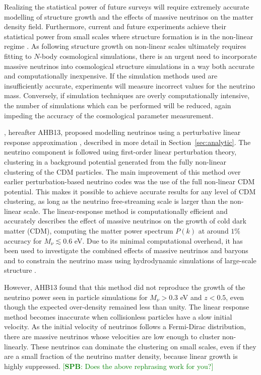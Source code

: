 \documentclass[useAMS, usenatbib]{mnras}
\newcommand{\spb}[1]{{\textcolor{green}{[{\bf SPB}: #1]}}}
\begin{document}
Realizing the statistical power of future surveys will require extremely accurate modelling of structure growth and the effects of massive neutrinos on the matter density field.
Furthermore, current and future experiments achieve their statistical power from small scales where structure formation is in the non-linear regime \citep[e.g.~][]{Troxel_2017, HSC_2017}.
As following structure growth on non-linear scales ultimately requires fitting to $N$-body cosmological simulations, there is an urgent need to incorporate massive neutrinos into cosmological structure simulations
in a way both accurate and computationally inexpensive.
If the simulation methods used are insufficiently accurate, experiments will measure incorrect values for the neutrino mass.
Conversely, if simulation techniques are overly computationally intensive, the number of simulations which can be performed will be reduced, again impeding the accuracy of the cosmological parameter measurement.

\cite{AHB}, hereafter AHB13, proposed modelling neutrinos using a perturbative linear response approximation \citep{Bond_1980, Ma_1994}, described in more detail in Section~\ref{sec:analytic}. The neutrino component is followed using first-order linear perturbation theory, clustering in a background potential generated from the fully non-linear clustering of the CDM particles. The main improvement of this method over earlier perturbation-based neutrino codes \citep{Brandbyge_2009} was the use of the full non-linear CDM potential. This makes it possible to achieve accurate results for any level of CDM clustering, as long as the neutrino free-streaming scale is larger than the non-linear scale.
The linear-response method is computationally efficient and accurately describes the effect of massive neutrinos on the growth of cold dark matter (CDM), computing the matter power spectrum $P(k)$ at around $1\%$ accuracy for $M_\nu \lesssim 0.6$ eV.
Due to its minimal computational overhead,
it has been used to investigate the combined effects of massive neutrinos and baryons \citep{Mummery_2017} and to constrain the neutrino mass using hydrodynamic simulations of large-scale structure \citep{McCarthy_2018, McCarthy_2017}.

However, AHB13 found that this method did not reproduce the growth of the neutrino power seen in particle simulations for $M_\nu > 0.3$ eV  and $z < 0.5$, even though the expected over-density remained less than unity. The linear response method becomes inaccurate when collisionless particles have a slow initial velocity. As the initial velocity of neutrinos follows a Fermi-Dirac distribution, there are massive neutrinos whose velocities are low enough to cluster non-linearly. These neutrinos can dominate the clustering on small scales, even if they are a small fraction of the neutrino matter density, because linear growth is highly suppressed. \spb{Does the above rephrasing work for you?}
\end{document}
